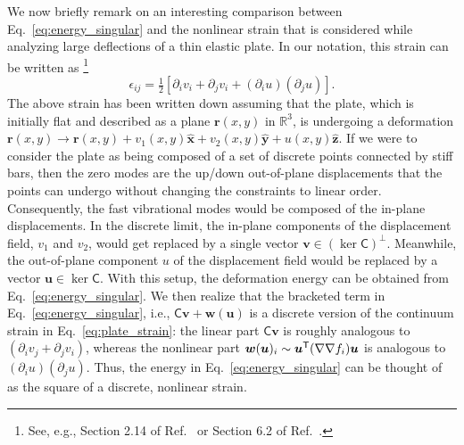 We now briefly remark on an interesting comparison between Eq.~\eqref{eq:energy_singular} and the nonlinear strain that is considered while analyzing large deflections of a thin elastic plate.
In our notation, this strain can be written as%
\footnote{See, e.g., Section 2.14 of Ref.~\cite{landau1986} or Section 6.2 of Ref.~\cite{nelson2004}.}
%
\begin{equation}
  \epsilon_{ij} = \tfrac{1}{2}\left[\partial_{i}v_{i} + \partial_{j}v_{i} + (\partial_{i}u)(\partial_{j}u)\right].
  \label{eq:plate_strain}
\end{equation}
%
The above strain has been written down assuming that the plate, which is initially flat and described as a plane $\bm{r}(x, y)$ in $\mathbb{R}^{3}$, is undergoing a deformation $\bm{r}(x, y) \to \bm{r}(x, y) + v_{1}(x, y)\hat{\bm{x}} + v_{2}(x, y)\hat{\bm{y}} + u(x, y)\hat{\bm{z}}$.
If we were to consider the plate as being composed of a set of discrete points connected by stiff bars, then the zero modes are the up/down out-of-plane displacements that the points can undergo without changing the constraints to linear order.
Consequently, the fast vibrational modes would be composed of the in-plane displacements.
In the discrete limit, the in-plane components of the displacement field, $v_{1}$ and $v_{2}$, would get replaced by a single vector $\bm{v} \in (\ker\mathsf{C})^{\perp}$.
Meanwhile, the out-of-plane component $u$ of the displacement field would be replaced by a vector $\bm{u} \in \ker\mathsf{C}$.
With this setup, the deformation energy can be obtained from Eq.~\eqref{eq:energy_singular}.
We then realize that the bracketed term in Eq.~\eqref{eq:energy_singular}, i.e., $\mathsf{C}\bm{v} + \bm{w}(\bm{u})$ is a discrete version of the continuum strain in Eq.~\eqref{eq:plate_strain}:
the linear part $\mathsf{C}\bm{v}$ is roughly analogous to $(\partial_{i}v_{j} + \partial_{j}v_{i})$, whereas the nonlinear part $\bm{w}(\bm{u})_{i} \sim \bm{u}^\mathsf{T}(\nabla\nabla f_{i})\bm{u}$ is analogous to $(\partial_{i} u)(\partial_{j} u)$.
Thus, the energy in Eq.~\eqref{eq:energy_singular} can be thought of as the square of a discrete, nonlinear strain.
